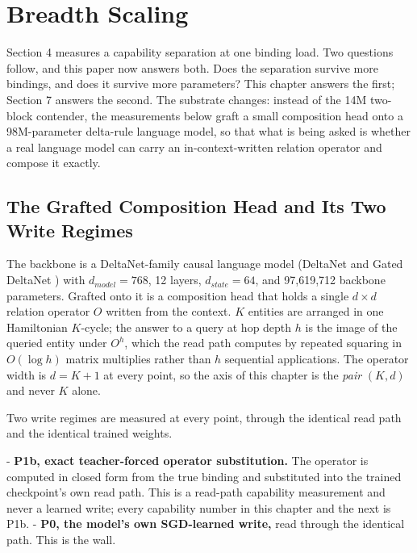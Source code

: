 \section{Breadth Scaling}

Section 4 measures a capability separation at one binding load. Two
questions follow, and this paper now answers both. Does the separation
survive more bindings, and does it survive more parameters? This chapter
answers the first; Section 7 answers the second. The substrate changes:
instead of the 14M two-block contender, the measurements below graft a
small composition head onto a 98M-parameter delta-rule language model,
so that what is being asked is whether a real language model can carry
an in-context-written relation operator and compose it exactly.

\subsection{The Grafted Composition Head and Its Two Write Regimes}

The backbone is a DeltaNet-family causal language model
(DeltaNet \citep{yang2025parallelizinglineartransformersdelta} and Gated DeltaNet \citep{yang2025gateddeltanetworksimproving}) with $d_{model}=768$, 12
layers, $d_{state}=64$, and 97,619,712 backbone parameters. Grafted onto
it is a composition head that holds a single $d \times d$ relation
operator $O$ written from the context. $K$ entities are arranged in one
Hamiltonian $K$-cycle; the answer to a query at hop depth $h$ is the
image of the queried entity under $O^{h}$, which the read path computes
by repeated squaring in $O(\log h)$ matrix multiplies rather than $h$
sequential applications. The operator width is $d = K{+}1$ at every
point, so the axis of this chapter is the \emph{pair} $(K, d)$ and never $K$
alone.

Two write regimes are measured at every point, through the identical
read path and the identical trained weights.

- \textbf{P1b, exact teacher-forced operator substitution.} The operator is
  computed in closed form from the true binding and substituted into the
  trained checkpoint's own read path. This is a read-path capability
  measurement and never a learned write; every capability number in this
  chapter and the next is P1b.
- \textbf{P0, the model's own SGD-learned write,} read through the identical
  path. This is the wall.

